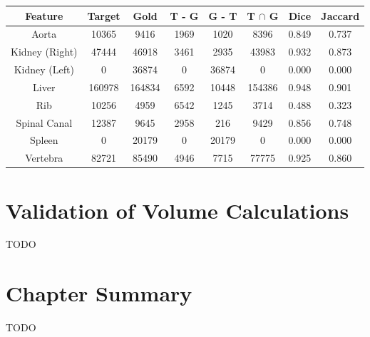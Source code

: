 \begin{center}
\begin{tabular}{cccccccc}
\scriptsize \textbf{Feature} & \scriptsize \textbf{Target} & \scriptsize \textbf{Gold} & \scriptsize \textbf{T - G} & \scriptsize \textbf{G - T} & \scriptsize \textbf{T $\cap$ G} & \scriptsize \textbf{Dice} & \scriptsize \textbf{Jaccard} \\
\hline
\scriptsize Aorta & \scriptsize 10365 & \scriptsize 9416 & \scriptsize 1969 & \scriptsize 1020 & \scriptsize 8396 & \scriptsize 0.849 & \scriptsize 0.737 \\
\scriptsize Kidney (Right) & \scriptsize 47444 & \scriptsize 46918 & \scriptsize 3461 & \scriptsize 2935 & \scriptsize 43983 & \scriptsize 0.932 & \scriptsize 0.873 \\
\scriptsize Kidney (Left) & \scriptsize 0 & \scriptsize 36874 & \scriptsize 0 & \scriptsize 36874 & \scriptsize 0 & \scriptsize 0.000 & \scriptsize 0.000 \\
\scriptsize Liver & \scriptsize 160978 & \scriptsize 164834 & \scriptsize 6592 & \scriptsize 10448 & \scriptsize 154386 & \scriptsize 0.948 & \scriptsize 0.901 \\
\scriptsize Rib & \scriptsize 10256 & \scriptsize 4959 & \scriptsize 6542 & \scriptsize 1245 & \scriptsize 3714 & \scriptsize 0.488 & \scriptsize 0.323 \\
\scriptsize Spinal Canal & \scriptsize 12387 & \scriptsize 9645 & \scriptsize 2958 & \scriptsize 216 & \scriptsize 9429 & \scriptsize 0.856 & \scriptsize 0.748 \\
\scriptsize Spleen & \scriptsize 0 & \scriptsize 20179 & \scriptsize 0 & \scriptsize 20179 & \scriptsize 0 & \scriptsize 0.000 & \scriptsize 0.000 \\
\scriptsize Vertebra & \scriptsize 82721 & \scriptsize 85490 & \scriptsize 4946 & \scriptsize 7715 & \scriptsize 77775 & \scriptsize 0.925 & \scriptsize 0.860 \\
\end{tabular}
\end{center}

\section{Validation of Volume Calculations}

TODO

\section{Chapter Summary}

TODO
